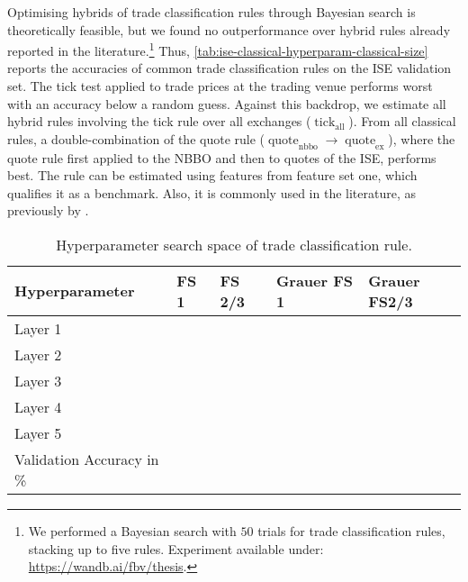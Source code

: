 Optimising hybrids of trade classification rules through Bayesian search is theoretically feasible, but we found no outperformance over hybrid rules already reported in the literature.\footnote{We performed a Bayesian search with $50$ trials for trade classification rules, stacking up to five rules. Experiment available under: \url{https://wandb.ai/fbv/thesis}.} Thus, \cref{tab:ise-classical-hyperparam-classical-size} reports the accuracies of common trade classification rules on the \gls{ISE} validation set. The tick test applied to trade prices at the trading venue performs worst with an accuracy below a random guess. Against this backdrop, we estimate all hybrid rules involving the tick rule over all exchanges ($\operatorname{tick}_{\mathrm{all}}$). From all classical rules, a double-combination of the quote rule ($\operatorname{quote}_{\mathrm{nbbo}} \to \operatorname{quote}_{\mathrm{ex}}$), where the quote rule first applied to the \gls{NBBO} and then to quotes of the \gls{ISE}, performs best. The rule can be estimated using features from feature set one, which qualifies it as a benchmark. Also, it is commonly used in the literature, as previously by \textcite[][]{muravyevOptionsTradingCosts2020}.


\begin{table}[H]
    \centering
    \caption[Hyperparameter Search Space of Trade Classification Rule]{Hyperparameter search space of trade classification rule.}
    \label{tab:solutions-classical-rules}
    \begin{tabular}{@{}lllll@{}}
        \toprule
        Hyperparameter            & FS 1 & FS 2/3 & Grauer FS 1 & Grauer FS2/3 \\ \midrule
        Layer 1                   &      &        &             &              \\
        Layer 2                   &      &        &             &              \\
        Layer 3                   &      &        &             &              \\
        Layer 4                   &      &        &             &              \\
        Layer 5                   &      &        &             &              \\ \midrule
        Validation Accuracy in \% &      &        &             &              \\ \bottomrule
    \end{tabular}
\end{table}

